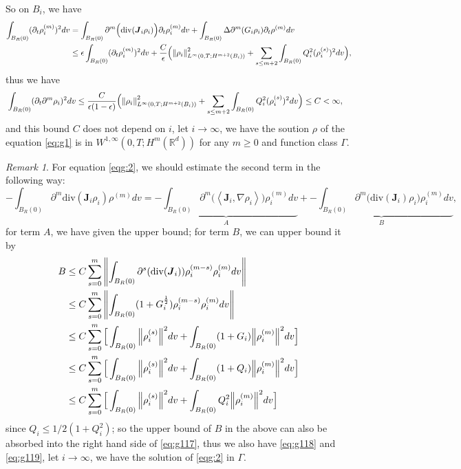 \documentclass[a4paper, 11pt]{article}
\newcommand{\inner}[2]{\left< #1 , #2 \right>}
\newcounter{results}[section]
\theoremstyle{plain}
\theoremstyle{remark}
\newtheorem{remark}[results]{Remark}
\theoremstyle{definition}
\renewcommand{\div}{\mathrm{div}}
\newcommand{\intr}{\int_{B_R(0)}}
\newcommand{\Q}{Q}
\newcommand{\J}{\boldsymbol{J}}
\begin{document}
	So on $B_i$, we have
			\begin{equation}
		\begin{aligned}
			\intr(\partial_t\rho_i^{(m)})^2dv
			&=\intr \partial^m\Big(\div(\J_i\rho_i)\Big)\partial_t\rho_i^{(m)} dv+\intr\Delta\partial^m(G_i\rho_i)\partial_t\rho^{(m)}dv\\
			&\leq \epsilon\intr(\partial_t\rho_i^{(m)})^2dv+\frac{C}{\epsilon}\Big(\norm{\rho_i}^2_{L^{\infty}(0,T;H^{m+2}(B_i))}+\sum_{s\leq m+2}\intr\Q_i^2(\rho_i^{(s)})^2dv\Big),
		\end{aligned}
	\end{equation}
	thus we have
	\begin{equation}
		\begin{aligned}
			&\intr(\partial_t\partial^m\rho_i)^2dv\leq \frac{C}{\epsilon(1-\epsilon)}\Big(\norm{\rho_i}^2_{L^{\infty}(0,T;H^{m+2}(B_i))}+\sum_{s\leq m+2}\intr\Q_i^2(\rho_i^{(s)})^2dv\Big)\leq C<\infty,
		\end{aligned}
	\end{equation}
	and this bound $C$ does not depend on $i$, let $i\to\infty$, we have the soution $\rho$ of the equation \eqref{eq:g1} is in $W^{1,\infty}(0,T;H^m(\mathbb{R}^d))$ for any $m\geq 0$ and function class $\Gamma$.
    \begin{remark}\label{rmk:g2211}
        For equation \eqref{eqg:2}, we should estimate the second term in the following way:
        \begin{equation}
            -\intr\partial^m\div(\J_i\rho_i)\rho^{(m)}dv=\underbrace{-\intr\partial^m\Big(\inner{\J_i}{\nabla\rho_i}\Big)\rho_i^{(m)}dv}_{A}+\underbrace{-\intr\partial^m\Big(\div(\J_i)\rho_i\Big)\rho_i^{(m)}dv}_{B},
        \end{equation}
        for term $A$, we have given the upper bound; for term $B$, we can upper bound it by
        \begin{equation}
            \begin{aligned}
                B&\leq C\sum_{s=0}^m\norm{\intr \partial^{s}(\div(\J_i))\rho_i^{(m-s)}\rho_i^{(m)}dv}\\
                &\leq C\sum_{s=0}^m\norm{\intr (1+G_i^{\frac{1}{2}})\rho_i^{(m-s)}\rho_i^{(m)}dv}\\
                &\leq C\sum_{s=0}^m\Big[\intr\norm{\rho_i^{(s)}}^2dv+\intr (1+G_i)\norm{\rho_i^{(m)}}^2dv\Big]\\
                &\leq C\sum_{s=0}^m\Big[\intr\norm{\rho_i^{(s)}}^2dv+\intr (1+Q_i)\norm{\rho_i^{(m)}}^2dv\Big]\\
                &\leq C\sum_{s=0}^m\Big[\intr\norm{\rho_i^{(s)}}^2dv+\intr Q_i^2\norm{\rho_i^{(m)}}^2dv\Big]
            \end{aligned}
        \end{equation}
        since $Q_i\leq 1/2(1+Q_i^2)$; so the upper bound of $B$ in the above can also be absorbed into the right hand side of \eqref{eq:g117}, thus we also have \eqref{eq:g118} and \eqref{eq:g119}, let $i\to\infty$, we have the solution of \eqref{eqg:2} in $\Gamma$.
    \end{remark}
\end{document}
